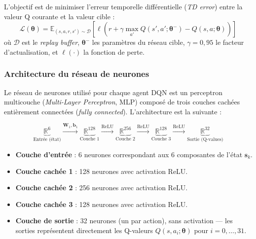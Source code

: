 \documentclass[conference]{IEEEtran}
\begin{document}
L'objectif est de minimiser l'erreur temporelle différentielle (\textit{TD error}) entre la valeur Q courante et la valeur cible :
\begin{equation}
    \mathcal{L}(\boldsymbol{\theta}) = \mathbb{E}_{(s,a,r,s') \sim \mathcal{D}} \left[ \ell\!\left(r + \gamma \max_{a'} Q(s', a'; \boldsymbol{\theta}^{-}) - Q(s, a; \boldsymbol{\theta})\right) \right]
    \label{eq:dqn_loss}
\end{equation}
où $\mathcal{D}$ est le \textit{replay buffer}, $\boldsymbol{\theta}^{-}$ les paramètres du réseau cible, $\gamma = 0{,}95$ le facteur d'actualisation, et $\ell(\cdot)$ la fonction de perte.

\subsubsection{Architecture du réseau de neurones}

Le réseau de neurones utilisé pour chaque agent DQN est un perceptron multicouche (\textit{Multi-Layer Perceptron}, MLP) composé de trois couches cachées entièrement connectées (\textit{fully connected}). L'architecture est la suivante :

\begin{equation}
    \underbrace{\mathbb{R}^6}_{\text{Entrée (état)}} \xrightarrow{\mathbf{W}_1, \mathbf{b}_1} \underbrace{\mathbb{R}^{128}}_{\text{Couche 1}} \xrightarrow{\text{ReLU}} \underbrace{\mathbb{R}^{256}}_{\text{Couche 2}} \xrightarrow{\text{ReLU}} \underbrace{\mathbb{R}^{128}}_{\text{Couche 3}} \xrightarrow{\text{ReLU}} \underbrace{\mathbb{R}^{32}}_{\text{Sortie (Q-values)}}
    \label{eq:architecture}
\end{equation}

\begin{itemize}
    \item \textbf{Couche d'entrée} : 6 neurones correspondant aux 6 composantes de l'état $\mathbf{s}_k$.
    \item \textbf{Couche cachée 1} : 128 neurones avec activation ReLU.
    \item \textbf{Couche cachée 2} : 256 neurones avec activation ReLU.
    \item \textbf{Couche cachée 3} : 128 neurones avec activation ReLU.
    \item \textbf{Couche de sortie} : 32 neurones (un par action), sans activation — les sorties représentent directement les Q-valeurs $Q(s, a_i; \boldsymbol{\theta})$ pour $i = 0, \dots, 31$.
\end{itemize}
\end{document}
